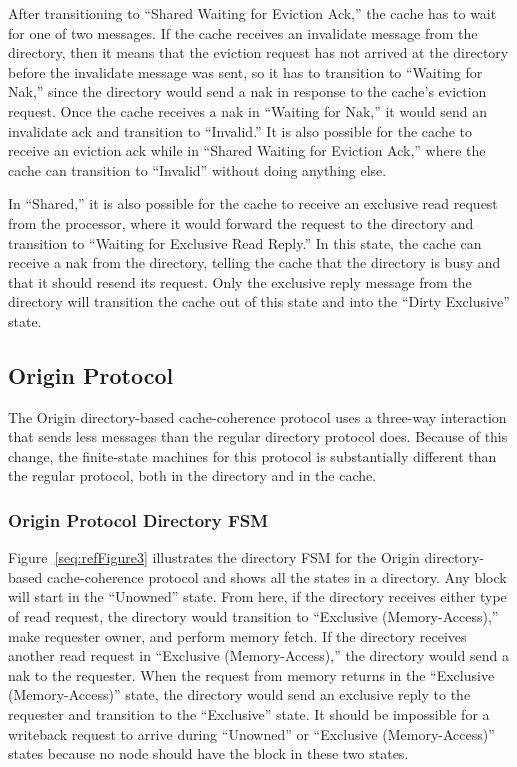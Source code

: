 \documentclass[letterpaper]{article}
\newcounter{Figure}
\begin{document}
After transitioning to ``Shared Waiting for Eviction Ack,'' the cache has to wait for one of two messages. If the cache receives an invalidate message from the directory, then it means that the eviction request has not arrived at the directory before the invalidate message was sent, so it has to transition to ``Waiting for Nak,'' since the directory would send a nak in response to the cache's eviction request. Once the cache receives a nak in ``Waiting for Nak,'' it would send an invalidate ack and transition to ``Invalid.'' It is also possible for the cache to receive an eviction ack while in ``Shared Waiting for Eviction Ack,'' where the cache can transition to ``Invalid'' without doing anything else.

In ``Shared,'' it is also possible for the cache to receive an exclusive read request from the processor, where it would forward the request to the directory and transition to ``Waiting for Exclusive Read Reply.'' In this state, the cache can receive a nak from the directory, telling the cache that the directory is busy and that it should resend its request. Only the exclusive reply message from the directory will transition the cache out of this state and into the ``Dirty Exclusive'' state.

\subsection{Origin Protocol}
The Origin directory-based cache-coherence protocol uses a three-way interaction that sends less messages than the regular directory protocol does. Because of this change, the finite-state machines for this protocol is substantially different than the regular protocol, both in the directory and in the cache.

\subsubsection{Origin Protocol Directory FSM}
Figure~\ref{seq:refFigure3} illustrates the directory FSM for the Origin directory-based cache-coherence protocol and shows all the states in a directory. Any block will start in the ``Unowned'' state. From here, if the directory receives either type of read request, the directory would transition to ``Exclusive (Memory-Access),'' make requester owner, and perform memory fetch. If the directory receives another read request in ``Exclusive (Memory-Access),'' the directory would send a nak to the requester. When the request from memory returns in the ``Exclusive (Memory-Access)'' state, the directory would send an exclusive reply to the requester and transition to the ``Exclusive'' state. It should be impossible for a writeback request to arrive during ``Unowned'' or ``Exclusive (Memory-Access)'' states because no node should have the block in these two states.
\end{document}

